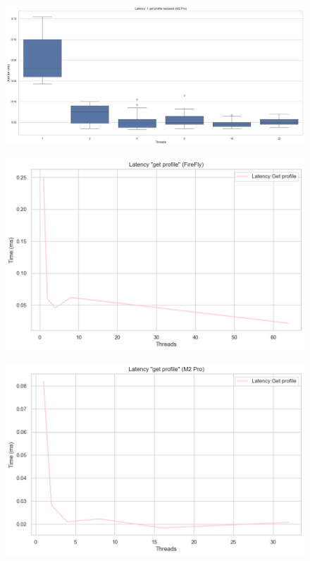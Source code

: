 \documentclass[a4paper]{article}
\begin{document}
\begin{figure}[H]
	\centering
	\includegraphics[width = \linewidth]{Images/LatencyBox.png}
	\caption{}
\end{figure}
\begin{figure}[H]
	\centering
	\includegraphics[width = \linewidth]{Images/LatencyProfileFirefly.png}
	\caption{}
\end{figure}
\begin{figure}[H]
	\centering
	\includegraphics[width = \linewidth]{Images/LatencyProfile.png}
	\caption{}
\end{figure}
\end{document}
